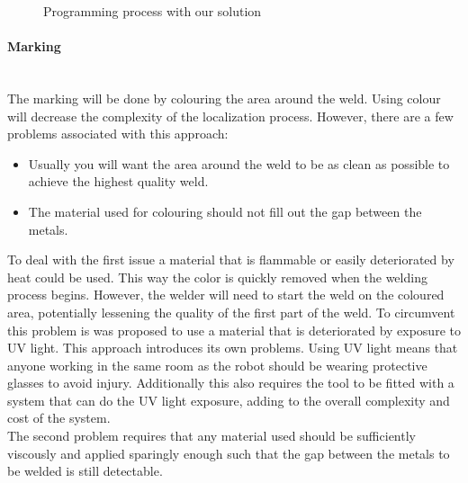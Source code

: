 \begin{figure}[h]
\centering
{}
\caption{Programming process with our solution}
\label{programming_state_diagram}
\end{figure}

\paragraph*{Marking}~\\
The marking will be done by colouring the area around the weld. 
Using colour will decrease the complexity of the localization process. 
However, there are a few problems associated with this approach: 
\begin{itemize}
	\item[] Usually you will want the area around the weld to be as clean as possible to achieve the highest quality weld.
	\item[] The material used for colouring should not fill out the gap between the metals.
\end{itemize}
To deal with the first issue a material that is flammable or easily deteriorated by heat could be used. 
This way the color is quickly removed when the welding process begins. 
However, the welder will need to start the weld on the coloured area, potentially lessening the quality of the first part of the weld. 
To circumvent this problem is was proposed to use a material that is deteriorated by exposure to UV light. 
This approach introduces its own problems. 
Using UV light means that anyone working in the same room as the robot should be wearing protective glasses to avoid injury. 
Additionally this also requires the tool to be fitted with a system that can do the UV light exposure, adding to the overall complexity and cost of the system.\\
The second problem requires that any material used should be sufficiently viscously and applied sparingly enough such that the gap between the metals to be welded is still detectable.

